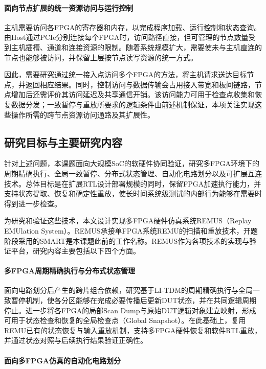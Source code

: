 \paragraph{面向节点扩展的统一资源访问与运行控制}

主机需要访问各FPGA的寄存器和内存，以完成程序加载、运行控制和状态查询。由Host通过PCIe分别连接每个FPGA时，访问路径直接，但可管理的节点数量受到主机插槽、通道和连接资源的限制。随着系统规模扩大，需要使未与主机直连的节点也能够被访问，并保留上层按节点读写资源的统一方式。

因此，需要研究通过统一接入点访问多个FPGA的方法，将主机请求送达目标节点，并返回相应结果。同时，控制访问与数据传输会占用接入带宽和板间链路，节点增加后还需评价其访问延迟及共享通信开销。该访问能力可用于检查点收集和恢复数据分发；一致暂停与重放所要求的逻辑条件由前述机制保证，本项关注实现这些操作所需的跨节点资源访问通路及其扩展性。

\subsection{研究目标与主要研究内容}

针对上述问题，本课题面向大规模SoC的软硬件协同验证，研究多FPGA环境下的周期精确执行、全局一致暂停、分布式状态管理、自动化电路划分以及可扩展互连技术。总体目标是在扩展RTL设计部署规模的同时，保留FPGA加速执行能力，并支持状态提取、恢复和确定性重放，使长时间系统级测试的内部行为能够在需要时得到进一步检查。

为研究和验证这些技术，本文设计实现多FPGA硬件仿真系统REMUS（Replay EMUlation System）。REMUS承接单FPGA系统REMU的扫描和重放技术，开题阶段采用的SMART是本课题此前的工作名称。REMUS作为各项技术的实现与验证平台，研究内容主要包括以下四个方面。

\paragraph{多FPGA周期精确执行与分布式状态管理}

面向电路划分后产生的跨片组合依赖，研究基于LI-TDM的周期精确执行与全局一致暂停机制，使各分区能够在完成必要传播后更新DUT状态，并在共同逻辑周期停止。进一步将各FPGA的局部Scan Dump与原始DUT逻辑对象建立映射，形成可用于状态检查和恢复的全局检查点（Global Snapshot）。在此基础上，复用REMU已有的状态恢复与输入重放机制，支持多FPGA硬件恢复和软件RTL重放，并通过状态对照与后续执行结果验证正确性。

\paragraph{面向多FPGA仿真的自动化电路划分}

